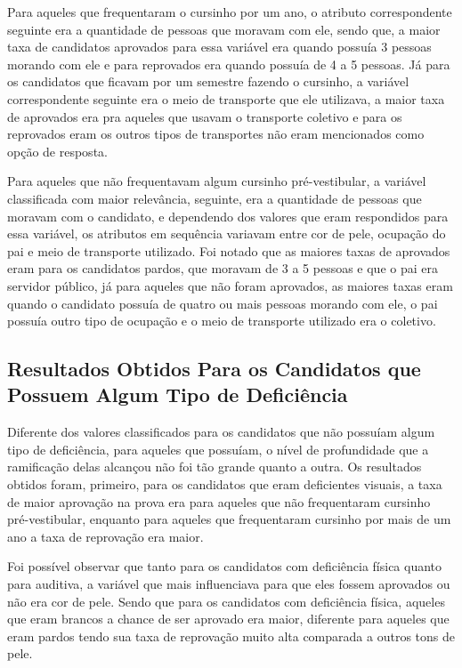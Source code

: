 \par
Para aqueles que frequentaram o cursinho por um ano, o atributo correspondente seguinte era a quantidade de pessoas que moravam com ele, sendo que, a maior taxa de candidatos aprovados para essa variável era quando possuía 3 pessoas morando com ele e para reprovados era quando possuía de 4 a 5 pessoas. Já para os candidatos que ficavam por um semestre fazendo o cursinho, a variável correspondente seguinte era o meio de transporte que ele utilizava, a maior taxa de aprovados era pra aqueles que usavam o transporte coletivo e para os reprovados eram os outros tipos de transportes não eram mencionados como opção de resposta.

\par
Para aqueles que não frequentavam algum cursinho pré-vestibular, a variável classificada com maior relevância, seguinte, era a quantidade de pessoas que moravam com o candidato, e dependendo dos valores que eram respondidos para essa variável, os atributos em sequência variavam entre cor de pele, ocupação do pai e meio de transporte utilizado. Foi notado que as maiores taxas de aprovados eram para os candidatos pardos, que moravam de 3 a 5 pessoas e que o pai era servidor público, já para aqueles que não foram aprovados, as maiores taxas eram quando o candidato possuía de quatro ou mais pessoas morando com ele, o pai possuía outro tipo de ocupação e o meio de transporte utilizado era o coletivo.


\subsection{Resultados Obtidos Para os Candidatos que Possuem Algum Tipo de Deficiência}


\par
Diferente dos valores classificados para os candidatos que não possuíam algum tipo de deficiência, para aqueles que possuíam, o nível de profundidade que a ramificação delas alcançou não foi tão grande quanto a outra. Os resultados obtidos foram, primeiro, para os candidatos que eram deficientes visuais, a taxa de maior aprovação na prova era para aqueles que não frequentaram cursinho pré-vestibular, enquanto para aqueles que frequentaram cursinho por mais de um ano a taxa de reprovação era maior.

\par
Foi possível observar que tanto para os candidatos com deficiência física quanto para auditiva, a variável que mais influenciava para que eles fossem aprovados ou não era cor de pele. Sendo que para os candidatos com deficiência física, aqueles que eram brancos a chance de ser aprovado era maior, diferente para aqueles que eram pardos tendo sua taxa de reprovação muito alta comparada a outros tons de pele.

